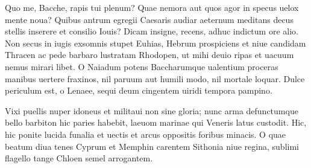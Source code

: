 \documentclass{book}
\newenvironment {carmen} [1] [\relax] 
  {\Titulus \Versus \incipit*\numerus{1}#1}
  {\endVersus}
\newcommand {\Alcaic}    {\Forma \strophae {0 \poena 01 \poena 2}}
\newcommand {\GlycAscl}  {\Forma \strophae {2 \poena 0}}
\begin{document}
\begin{carmen}[\GlycAscl]


     Quo me, Bacche, rapis tui
 plenum? Quae nemora aut quos agor in specus
      uelox mente noua? Quibus
 antrum egregii Caesaris audiar
      aeternum meditans decus               
 stellis inserere et consilio Iouis?
      Dicam insigne, recens, adhuc
 indictum ore alio. Non secus in iugis
      exsomnis stupet Euhias,
 Hebrum prospiciens et niue candidam               
      Thracen ac pede barbaro
 lustratam Rhodopen, ut mihi deuio
      ripas et uacuum nemus
 mirari libet. O Naiadum potens
      Baccharumque ualentium               
 proceras manibus uertere fraxinos,
      nil paruum aut humili modo,
 nil mortale loquar. Dulce periculum est,
      o Lenaee, sequi deum
 cingentem uiridi tempora pampino.                

\end{carmen}

\begin{carmen}[\Alcaic]


Vixi puellis nuper idoneus
 et militaui non sine gloria;
      nunc arma defunctumque bello
      barbiton hic paries habebit, 
laeuom marinae qui Veneris latus               
 custodit. Hic, hic ponite lucida
      funalia et uectis et arcus
      oppositis foribus minacis. 
O quae beatum diua tenes Cyprum et
 Memphin carentem Sithonia niue               
      regina, sublimi flagello
      tange Chloen semel arrogantem. 

\end{carmen}
\end{document}
